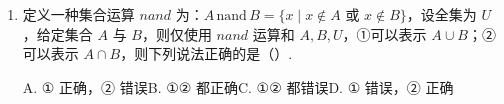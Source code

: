 \documentclass[a4paper,11pt]{article}
\begin{document}
\begin{enumerate}
\fi

\item 定义一种集合运算 $nand$ 为：$A\,\text{nand}\,B=\{x\mid x\notin A\text{ 或 }x\notin B\}$，设全集为 $U$，给定集合 $A$ 与 $B$，则仅使用 $nand$ 运算和 $A,B,U$，①可以表示 $A\cup B$；②可以表示 $A\cap B$，则下列说法正确的是\mbox{（\quad）.}

\keepwithprev
A. ① 正确，② 错误\qquad B. ①② 都正确\qquad C. ①② 都错误\qquad D. ① 错误，② 正确


\ifanswer
\solbegin
{}
\solend

\fi
\end{enumerate}

\end{document}
